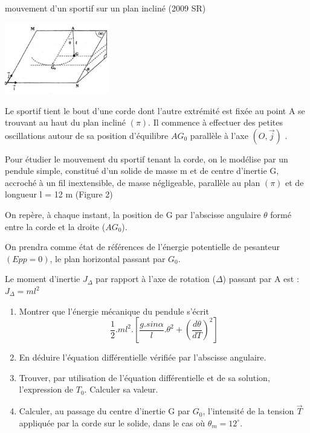 \documentclass[12pt]{article}
\begin{document}
\begin{Box2}{mouvement d’un sportif sur un plan incliné (2009 SR) }
		\begin{center}
			\includegraphics[width=0.34\textwidth]{./img/incli01.png}
      
		\end{center}


  Le sportif tient le bout d’une corde dont l’autre extrémité est fixée au point A se
trouvant au haut du plan incliné $(\pi)$. Il commence à effectuer des petites oscillations
autour de sa position d’équilibre $AG_0$ parallèle à l’axe
  $(O, \vec{j})$ .

Pour étudier le mouvement du sportif tenant la corde, on le modélise par un pendule
simple, constitué d’un solide de masse m et de centre d’inertie G, accroché à un fil
inextensible, de masse négligeable, parallèle au plan $(\pi)$ et de longueur l = 12 m
(Figure 2)

On repère, à chaque instant, la position de G par l’abscisse angulaire $\theta$ formé entre la
corde et la droite ($AG_0$).

On prendra comme état de références de l’énergie potentielle de pesanteur $(Epp = 0)$,
le plan horizontal passant par $G_0$.

Le moment d’inertie $J_\Delta$ par rapport à l’axe de rotation ($\Delta$) passant par A est : $J_{\Delta} = ml^2$

\begin{enumerate}
  \item Montrer que l’énergie mécanique du pendule s’écrit $$\frac{1}{2}.ml^2.[\frac{g.sin\alpha}{l}.\theta^2 + (\frac{d\theta}{dT})^2]$$
  \item En déduire l’équation différentielle vérifiée par l’abscisse angulaire.
  \item Trouver, par utilisation de l’équation différentielle et de sa solution,
l’expression de $T_0$. Calculer sa valeur.
\item Calculer, au passage du centre d’inertie G par $G_0$, l’intensité de la tension $\vec{T}$ appliquée par la corde sur le solide, dans le cas où $\theta_m = 12^{\circ}$.
\end{enumerate}
\end{Box2}
\end{document}
